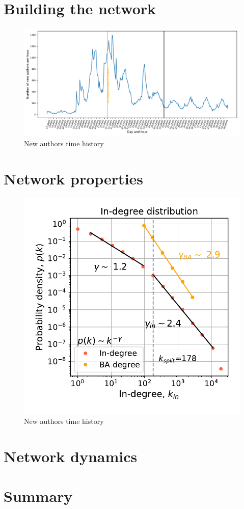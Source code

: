 \documentclass[10pt, twoside]{report}
\begin{document}
    \chapter{Building the network}

    \begin{figure}[htbp]
      \centering
\includegraphics[width=\textwidth]{../../scripts/visualization/imgs/time_history.pdf}
      \caption{New authors time history}
      \label{fig:time_history}
    \end{figure}


    \chapter{Network properties}


    \begin{figure}[htbp]
      \centering
      \includegraphics[width=\textwidth]{../../scripts/visualization/imgs/in_degree_distribution.pdf}
      \caption{New authors time history}
      \label{fig:time_history}
    \end{figure}


    \chapter{Network dynamics}

    

    

    \chapter{Summary}


\printbibliography[title={References}]
\end{document}
